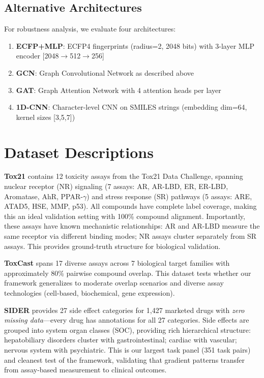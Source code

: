 \documentclass{article}
\begin{document}
\subsection{Alternative Architectures}
For robustness analysis, we evaluate four architectures:
\begin{enumerate}[nosep,topsep=2pt]
    \item \textbf{ECFP+MLP}: ECFP4 fingerprints \citep{rogers2010ecfp} (radius=2, 2048 bits) with 3-layer MLP encoder [2048$\rightarrow$512$\rightarrow$256]
    \item \textbf{GCN}: Graph Convolutional Network \citep{kipf2017semi} as described above
    \item \textbf{GAT}: Graph Attention Network \citep{velickovic2018gat} with 4 attention heads per layer
    \item \textbf{1D-CNN}: Character-level CNN on SMILES strings \citep{weininger1988smiles} (embedding dim=64, kernel sizes [3,5,7])
\end{enumerate}

\section{Dataset Descriptions}
\label{app:datasets}

\textbf{Tox21} contains 12 toxicity assays from the Tox21 Data Challenge, spanning nuclear receptor (NR) signaling (7 assays: AR, AR-LBD, ER, ER-LBD, Aromatase, AhR, PPAR-$\gamma$) and stress response (SR) pathways (5 assays: ARE, ATAD5, HSE, MMP, p53). All compounds have complete label coverage, making this an ideal validation setting with 100\% compound alignment. Importantly, these assays have known mechanistic relationships: AR and AR-LBD measure the same receptor via different binding modes; NR assays cluster separately from SR assays. This provides ground-truth structure for biological validation.

\textbf{ToxCast} spans 17 diverse assays across 7 biological target families with approximately 80\% pairwise compound overlap. This dataset tests whether our framework generalizes to moderate overlap scenarios and diverse assay technologies (cell-based, biochemical, gene expression).

\textbf{SIDER} \citep{kuhn2016sider} provides 27 side effect categories for 1,427 marketed drugs with \textit{zero missing data}---every drug has annotations for all 27 categories. Side effects are grouped into system organ classes (SOC), providing rich hierarchical structure: hepatobiliary disorders cluster with gastrointestinal; cardiac with vascular; nervous system with psychiatric. This is our largest task panel (351 task pairs) and cleanest test of the framework, validating that gradient patterns transfer from assay-based measurement to clinical outcomes.
\end{document}
